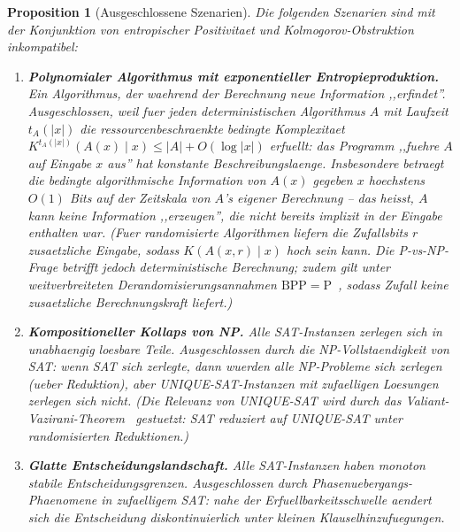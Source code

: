 \documentclass[aps,prd,twocolumn,superscriptaddress,nofootinbib]{revtex4-2}
\newtheorem{proposition}[theorem]{Proposition}
\theoremstyle{definition}
\theoremstyle{remark}
\newcommand{\PP}{\mathrm{P}}
\newcommand{\BPP}{\mathrm{BPP}}
\begin{document}
\begin{proposition}[Ausgeschlossene Szenarien]
\label{prop:excluded}
Die folgenden Szenarien sind mit der Konjunktion von entropischer Positivitaet und Kolmogorov-Obstruktion inkompatibel:

\begin{enumerate}
\item[\textbf{(X1)}] \textbf{Polynomialer Algorithmus mit exponentieller Entropieproduktion.} Ein Algorithmus, der waehrend der Berechnung neue Information ,,erfindet''. Ausgeschlossen, weil fuer jeden deterministischen Algorithmus $A$ mit Laufzeit $t_A(|x|)$ die ressourcenbeschraenkte bedingte Komplexitaet $K^{t_A(|x|)}(A(x) \mid x) \leq |A| + O(\log|x|)$ erfuellt: das Programm ,,fuehre $A$ auf Eingabe $x$ aus'' hat konstante Beschreibungslaenge. Insbesondere betraegt die \textit{bedingte} algorithmische Information von $A(x)$ gegeben $x$ hoechstens $O(1)$ Bits auf der Zeitskala von $A$'s eigener Berechnung -- das heisst, $A$ kann keine Information ,,erzeugen'', die nicht bereits implizit in der Eingabe enthalten war. (Fuer randomisierte Algorithmen liefern die Zufallsbits $r$ zusaetzliche Eingabe, sodass $K(A(x,r) \mid x)$ hoch sein kann. Die P-vs-NP-Frage betrifft jedoch deterministische Berechnung; zudem gilt unter weitverbreiteten Derandomisierungsannahmen $\BPP = \PP$~\cite{ImpagliazzoWigderson1997}, sodass Zufall keine zusaetzliche Berechnungskraft liefert.)

\item[\textbf{(X2)}] \textbf{Kompositioneller Kollaps von NP.} Alle SAT-Instanzen zerlegen sich in unabhaengig loesbare Teile. Ausgeschlossen durch die NP-Vollstaendigkeit von SAT: wenn SAT sich zerlegte, dann wuerden alle NP-Probleme sich zerlegen (ueber Reduktion), aber UNIQUE-SAT-Instanzen mit zufaelligen Loesungen zerlegen sich nicht. (Die Relevanz von UNIQUE-SAT wird durch das Valiant-Vazirani-Theorem~\cite{ValiantVazirani1986} gestuetzt: SAT reduziert auf UNIQUE-SAT unter randomisierten Reduktionen.)

\item[\textbf{(X3)}] \textbf{Glatte Entscheidungslandschaft.} Alle SAT-Instanzen haben monoton stabile Entscheidungsgrenzen. Ausgeschlossen durch Phasenuebergangs-Phaenomene in zufaelligem SAT: nahe der Erfuellbarkeitsschwelle aendert sich die Entscheidung diskontinuierlich unter kleinen Klauselhinzufuegungen.
\end{enumerate}
\end{proposition}


\end{document}
